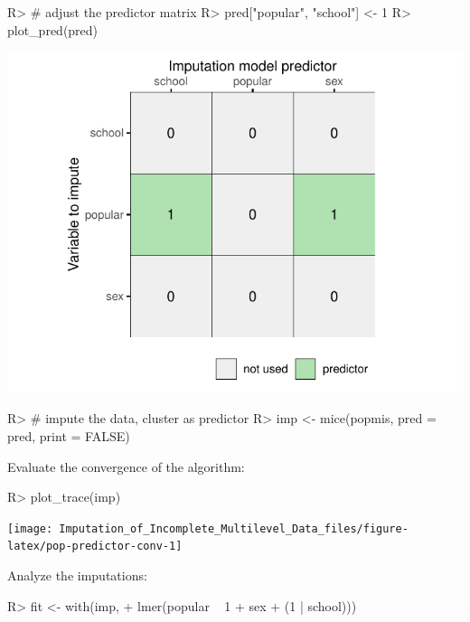 \documentclass[
]{jss}
\begin{document}
\begin{CodeChunk}
\begin{CodeInput}
R> # adjust the predictor matrix
R> pred["popular", "school"] <- 1 
R> plot_pred(pred)
\end{CodeInput}


\begin{center}\includegraphics{Imputation_of_Incomplete_Multilevel_Data_files/figure-latex/pop_predictor-1} \end{center}

\begin{CodeInput}
R> # impute the data, cluster as predictor
R> imp <- mice(popmis, pred = pred, print = FALSE)
\end{CodeInput}
\end{CodeChunk}

Evaluate the convergence of the algorithm:

\begin{CodeChunk}
\begin{CodeInput}
R> plot_trace(imp)
\end{CodeInput}


\begin{center}\texttt{[image: Imputation\_of\_Incomplete\_Multilevel\_Data\_files/figure-latex/pop-predictor-conv-1]} \end{center}

\end{CodeChunk}

Analyze the imputations:

\begin{CodeChunk}
\begin{CodeInput}
R> fit <- with(imp, 
+             lmer(popular ~ 1 + sex + (1 | school))) 
\end{CodeInput}
\end{CodeChunk}
\end{document}
